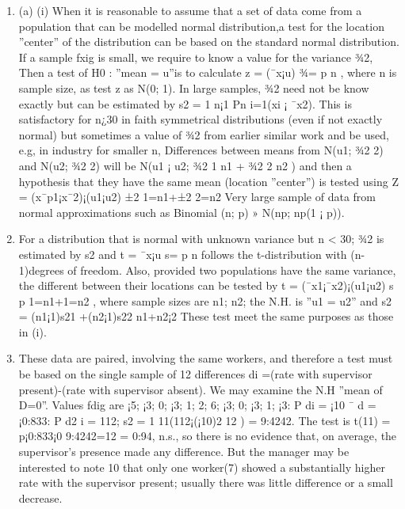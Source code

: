 \documentclass[a4paper,12pt]{article}
\begin{document}
\begin{enumerate}
 \item (a) (i) When it is reasonable to assume that a set of data come from a population that can
be modelled normal distribution,a test for the location ”center” of the distribution
can be based on the standard normal distribution. If a sample fxig is small, we
require to know a value for the variance ¾2, Then a test of H0 : ”mean = u”is to
calculate z = (¯x¡u)
¾=
p
n , where n is sample size, as test z as N(0; 1). In large samples,
¾2 need not be know exactly but can be estimated by s2 = 1
n¡1
Pn
i=1(xi ¡ ¯x2).
This is satisfactory for n¿30 in faith symmetrical distributions (even if not exactly
normal) but sometimes a value of ¾2 from earlier similar work and be used, e.g,
in industry for smaller n, Differences between means from N(u1; ¾2
2) and N(u2; ¾2
2)
will be N(u1 ¡ u2; ¾2
1
n1
+ ¾2
2
n2
) and then a hypothesis that they have the same mean
(location ”center”) is tested using Z = (x¯p1¡x¯2)¡(u1¡u2)
±2
1=n1+±2
2=n2
Very large sample of data
from normal approximations such as Binomial (n; p) » N(np; np(1 ¡ p)).
\item For a distribution that is normal with unknown variance but n < 30; ¾2 is estimated
by s2 and t = ¯x¡u
s=
p
n follows the t-distribution with (n-1)degrees of freedom.
Also, provided two populations have the same variance, the different between their
locations can be tested by t = (¯x1¡¯x2)¡(u1¡u2)
s
p
1=n1+1=n2
, where sample sizes are n1; n2; the
N.H. is ”u1 = u2” and s2 = (n1¡1)s21
+(n2¡1)s22
n1+n2¡2 These test meet the same purposes as
those in (i).
\item  These data are paired, involving the same workers, and therefore a test must be based on
the single sample of 12 differences di =(rate with supervisor present)-(rate with supervisor
absent). We may examine the N.H ”mean of D=0”. Values fdig are ¡5; ¡3; 0; ¡3; 1; 2; 6;
¡3; 0; ¡3; 1; ¡3:
P
di = ¡10 ¯ d = ¡0:833:
P
d2
i = 112; s2 = 1
11(112¡(¡10)2
12 ) = 9:4242.
The test is t(11) = p¡0:833¡0
9:4242=12
= 0:94, n.s., so there is no evidence that, on average, the
supervisor’s presence made any difference. But the manager may be interested to note
10
that only one worker(7) showed a substantially higher rate with the supervisor present;
usually there was little difference or a small decrease.
\end{enumerate}
\end{document}
